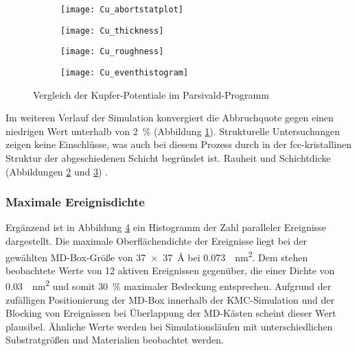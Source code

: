\begin{figure}[bth]
  \captionsetup[subfigure]{singlelinecheck=false}
  \def\subfigwidth{0.49\textwidth}
  \begin{subfigure}[t]{\subfigwidth}
    \texttt{[image: Cu\_abortstatplot]}
    \label{fig:copperparsivald-a}
  \end{subfigure}
  \hfill
  \begin{subfigure}[t]{\subfigwidth}
    \texttt{[image: Cu\_thickness]}
    \label{fig:copperparsivald-b}
  \end{subfigure}
  \begin{subfigure}[t]{\subfigwidth}
    \texttt{[image: Cu\_roughness]}
    \label{fig:copperparsivald-c}
  \end{subfigure}
  \hfill
  \begin{subfigure}[t]{\subfigwidth}
    \texttt{[image: Cu\_eventhistogram]}
    \label{fig:copperparsivald-d}
  \end{subfigure}
  \caption{Vergleich der Kupfer-Potentiale im Parsivald-Programm}
  \label{fig:copperparsivald}
\end{figure}

Im weiteren Verlauf der Simulation konvergiert die Abbruchquote gegen einen niedrigen Wert unterhalb von \SI{2}{\percent} (Abbildung \ref{fig:copperparsivald-a}).
Strukturelle Untersuchungen zeigen keine Einschlüsse, was auch bei diesem Prozess durch in der fcc-kristallinen Struktur der abgeschiedenen Schicht begründet ist.
Rauheit und Schichtdicke (Abbildungen \ref{fig:copperparsivald-b} und \ref{fig:copperparsivald-c}) .

\subsubsection{Maximale Ereignisdichte}
Ergänzend ist in Abbildung \ref{fig:copperparsivald-d} ein Histogramm der Zahl paralleler Ereignisse dargestellt.
Die maximale Oberflächendichte der Ereignisse liegt bei der gewählten MD-Box-Größe von \SI{37x37}{\angstrom} bei \SI{0.073}{\per\nano\meter\squared}.
Dem stehen beobachtete Werte von 12 aktiven Ereignissen gegenüber, die einer Dichte von \SI{0.03}{\per\nano\meter\squared} und somit \SI{30}{\percent} maximaler Bedeckung entsprechen.
Aufgrund der zufälligen Positionierung der MD-Box innerhalb der KMC-Simulation und der Blocking von Ereignissen bei Überlappung der MD-Kästen scheint dieser Wert plausibel.
Ähnliche Werte werden bei Simulationsläufen mit unterschiedlichen Substratgrößen und Materialien beobachtet werden.

